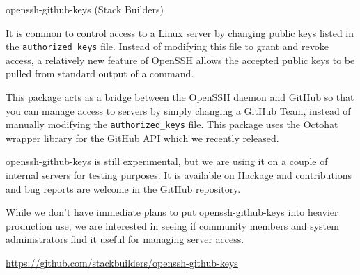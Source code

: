 \documentclass[DIV16,twocolumn,10pt]{scrreprt}
\begin{document}
\begin{hcarentry}{openssh-github-keys (Stack Builders)}
\makeheader

It is common to control access to a Linux server by changing public
keys listed in the \texttt{authorized\_keys} file. Instead of
modifying this file to grant and revoke access, a relatively new
feature of OpenSSH allows the accepted public keys to be pulled from
standard output of a command.

This package acts as a bridge between the OpenSSH daemon and GitHub so
that you can manage access to servers by simply changing a GitHub
Team, instead of manually modifying the \texttt{authorized\_keys}
file. This package uses the
\href{http://hackage.haskell.org/package/octohat}{Octohat} wrapper
library for the GitHub API which we recently released.

openssh-github-keys is still experimental, but we are using it on a
couple of internal servers for testing purposes. It is available on
\href{http://hackage.haskell.org/package/openssh-github-keys}{Hackage}
and contributions and bug reports are welcome in the
\href{https://github.com/stackbuilders/openssh-github-keys}{GitHub
  repository}.

While we don't have immediate plans to put openssh-github-keys into
heavier production use, we are interested in seeing if community
members and system administrators find it useful for managing server
access.

\FurtherReading
  \url{https://github.com/stackbuilders/openssh-github-keys}
\end{hcarentry}
\end{document}
